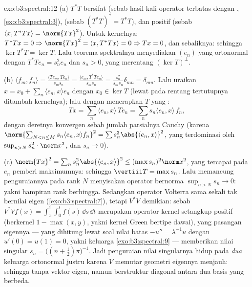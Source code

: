 \begin{solution}{exo:b3:spectral:12}
(a) $T^*T$ bersifat  (sebab hasil kali operator terbatas dengan , \cref{exo:b3:spectral:3}), 
(sebab $(T^*T)^* = T^*T$), dan positif (sebab $\langle x, T^*Tx\rangle =
\norm{Tx}^2$). Untuk kernelnya: $T^*Tx = 0 \Rightarrow \norm{Tx}^2 =
\langle x, T^*Tx\rangle = 0 \Rightarrow Tx = 0$, dan
sebaliknya: sehingga $\ker T^*T = \ker T$. Lalu teorema spektralnya
menyediakan $(e_n)$ yang ortonormal dengan $T^*Te_n = s_n^2e_n$ dan
$s_n > 0$, yang merentang $(\ker T)^\perp$.

(b) $\langle f_m, f_n\rangle = \frac{\langle Te_m,
Te_n\rangle}{s_ms_n} = \frac{\langle e_m,
T^*Te_n\rangle}{s_ms_n} = \frac{s_n^2}{s_ms_n}\delta_{mn} =
\delta_{mn}$. Lalu uraikan $x = x_0 + \sum_n\langle e_n, x\rangle
e_n$ dengan $x_0 \in \ker T$ (lewat  pada rentang tertutupnya ditambah
kernelnya); lalu dengan menerapkan $T$ yang :
\[
Tx = \sum_n\langle e_n, x\rangle\,Te_n =
\sum_ns_n\langle e_n, x\rangle\,f_n,
\]
dengan deretnya konvergen sebab jumlah parsialnya Cauchy
(karena $\norm{\sum_{N<n\leq M}s_n\langle e_n, x\rangle f_n}^2 =
\sum s_n^2\abs{\langle e_n, x\rangle}^2$, yang terdominasi oleh
$\sup_{n>N}s_n^2\cdot\norm x^2$, dan $s_n \to 0$).

(c) $\norm{Tx}^2 = \sum_ns_n^2\abs{\langle e_n, x\rangle}^2
\leq (\max s_n)^2\norm x^2$, yang tercapai pada $e_n$ pemberi
maksimumnya: sehingga $\vertiii T = \max s_n$. Lalu memancung penguraiannya pada rank
$N$ menyisakan operator bernorma $\sup_{n>N}s_n \to 0$: yakni
hampiran rank berhingga. Sedangkan operator Volterra sama sekali tak bernilai
eigen (\cref{exo:b3:spectral:7}), tetapi $V^*V$ demikian:
sebab $V^*Vf(x) = \int_x^1\int_0^tf(s)\,\dd s\,\dd t$ merupakan
operator kernel setangkup positif (berkernel $1 - \max(x,y)$,
yakni kernel Green bertipe dawai), yang pasangan eigennya --- yang dihitung
lewat soal nilai batas $-u'' = \lambda^{-1}u$ dengan $u'(0)
= u(1) = 0$, yakni keluarga \cref{exo:b3:spectral:9} --- memberikan
nilai singular $s_n = \bigl((n + \frac12)\pi\bigr)^{-1}$.
Jadi penguraian nilai singularnya hidup pada \emph{dua} keluarga ortonormal justru
karena $V$ memutar geometri eigennya menjauh: sehingga tanpa vektor eigen,
namun berstruktur diagonal  antara dua basis yang berbeda.
\end{solution}

